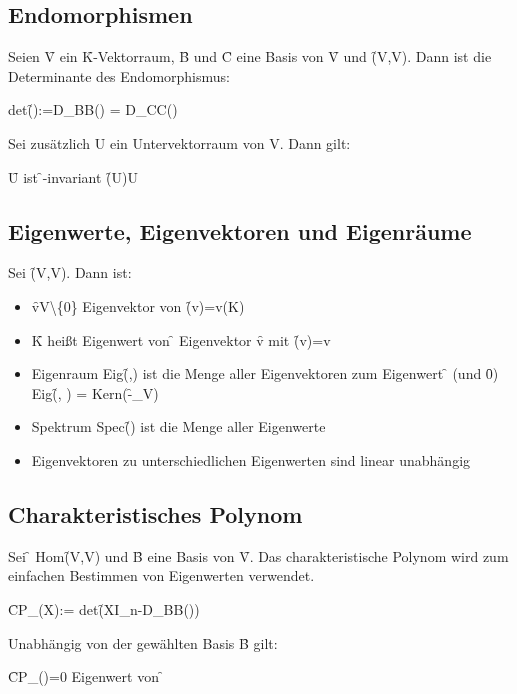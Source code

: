 \subsection{Endomorphismen}
Seien \f{V} ein \f{K}-Vektorraum, \f{B} und \f{C} eine Basis von \f{V} und \f{\Phi\in{}(V,V)}. Dann ist die Determinante des Endomorphismus:
\begin{center}
    det\f{(\Phi):=D_{BB}(\Phi) = D_{CC}(\Phi)}
\end{center}
Sei zusätzlich U ein Untervektorraum von V. Dann gilt:
\begin{center}
    \f{U} ist \f{\Phi}-invariant \f{\Leftrightarrow \Phi(U)\subseteq U}
\end{center}





\subsection{Eigenwerte, Eigenvektoren und Eigenräume}
Sei \f{\Phi\in{}(V,V)}. Dann ist:
\begin{itemize}
    \item \f{v\in V\backslash\left\{0\right\}} Eigenvektor von \f{\Phi\quad\Leftrightarrow\quad \Phi(v)=\lambda v\quad(\lambda\in K)}
    \item \f{\lambda\in K} heißt Eigenwert von \f{\Phi\quad\Leftrightarrow\quad\exists} Eigenvektor \f{v} mit \f{\Phi(v)=\lambda v}
    \item Eigenraum Eig\f{(\Phi,\lambda)} ist die Menge aller Eigenvektoren zum Eigenwert \f{\lambda} (und \f{0})\\
    Eig\f{(\Phi, \lambda)} = Kern(\f{\Phi-\lambda\cdot{}_V})
    \item Spektrum Spec(\f{\Phi}) ist die Menge aller Eigenwerte
    \item Eigenvektoren zu unterschiedlichen Eigenwerten sind linear unabhängig
\end{itemize}

\subsection{Charakteristisches Polynom}
Sei \f{\Phi\in} Hom\f{(V,V)} und \f{B} eine Basis von \f{V}. Das charakteristische Polynom wird zum einfachen Bestimmen von Eigenwerten verwendet.
\begin{center}\f{CP_\Phi(X):=} det\f{(XI_n-D_{BB}(\Phi))}\\\end{center}
Unabhängig von der gewählten Basis \f{B} gilt:
\begin{center}\f{CP_\Phi(\lambda)=0 \Leftrightarrow \lambda} Eigenwert von \f{\Phi}\end{center}

